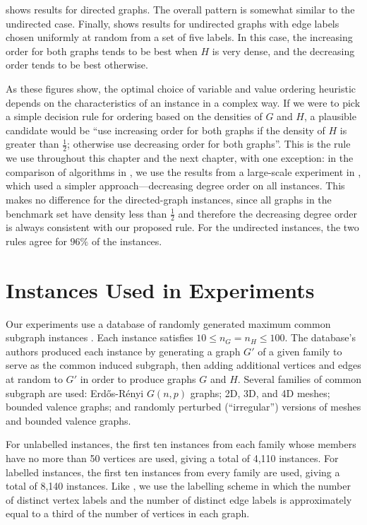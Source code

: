  shows results for directed graphs. The overall
pattern is somewhat similar to the undirected case.
Finally,
 shows results for undirected graphs with
edge labels chosen uniformly at random from a set of five labels.  In this
case, the increasing order for both graphs tends to be best when $H$ is
very dense, and the decreasing order tends to be best otherwise.

As these figures show, the optimal choice of variable and
value ordering heuristic depends on the characteristics of an instance in a
complex way.  If we were to pick a simple decision rule for ordering based on
the densities of $G$ and $H$, a plausible candidate would be ``use increasing
order for both graphs if the density of $H$ is greater than $\frac{1}{2}$;
otherwise use decreasing order for both graphs''.  This is the rule we use
throughout this chapter and the next chapter, with one exception: in the
comparison of algorithms in , we use the
results from a large-scale experiment in
\citet{DBLP:conf/ijcai/McCreeshPT17}, which
used a simpler approach---decreasing
degree order on all instances.
This makes no difference for the directed-graph instances, since
all graphs in the benchmark set have density less than $\frac{1}{2}$
and therefore the decreasing degree order is always consistent with
our proposed rule.
For the undirected instances, the two rules agree for $96\%$ of the
instances.

\FloatBarrier

\section{Instances Used in Experiments}\label{sec:mcis-instances}

Our experiments use a database of randomly generated maximum common subgraph
instances \citep{DBLP:journals/prl/SantoFSV03,DBLP:journals/jgaa/ConteFV07}.
Each instance satisfies $10 \leq n_G = n_H \leq 100$.  The database's authors
produced each instance by generating a graph $G'$ of a given family to serve as
the common induced subgraph, then adding additional vertices and edges at
random to $G'$ in order to produce graphs $G$ and $H$. Several families of
common subgraph are used: Erd\H{o}s-Rényi $G(n,p)$ graphs; 2D, 3D, and 4D meshes;
bounded valence graphs; and randomly perturbed (``irregular'') versions of
meshes and bounded valence graphs.

For unlabelled instances, the
first ten instances from each family whose members have no more than 50
vertices are used, giving a total of 4,110 instances.  For labelled instances,
the first ten instances from every family are used, giving a total of 8,140
instances. Like \citet{DBLP:conf/cp/McCreeshNPS16}, we use the labelling scheme
in which the number of distinct vertex labels and the number of distinct edge
labels is approximately equal to a third of the number of vertices in each
graph.


